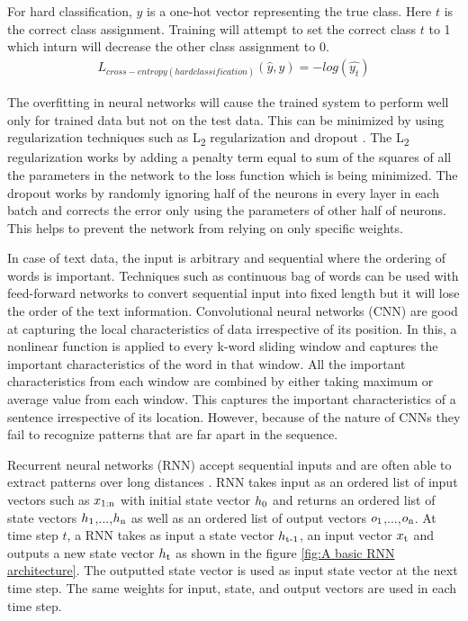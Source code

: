 \documentclass[a4paper, 11pt]{article}
\begin{document}
For hard classification, $y$ is a one-hot vector representing the true class. Here $t$ is the correct class assignment. Training will attempt to set the correct class $t$ to 1 which inturn will decrease the other class assignment to 0.
\begin{align*}
L_{cross-entropy(hard classification)}(\hat{y},y) = -log(\hat{y_t})
\end{align*}

The overfitting in neural networks will cause the trained system to perform well only for trained data but not on the test data. This can be minimized by using regularization techniques such as L\textsubscript{2} regularization and dropout \cite{Hinton2012}. The L\textsubscript{2} regularization works by adding a penalty term equal to sum of the squares of all the parameters in the network to the loss function which is being minimized. The dropout works by randomly ignoring half of the neurons in every layer in each batch and corrects the error only using the parameters of other half of neurons. This helps to prevent the network from relying on only specific weights. 

In case of text data, the input is arbitrary and sequential where the ordering of words is important. Techniques such as continuous bag of words \cite{DBLP:journals/corr/abs-1301-3781} can be used with feed-forward networks to convert sequential input into fixed length but it will lose the order of the text information. Convolutional neural networks (CNN) \cite{Bengio1997} are good at capturing the local characteristics of data irrespective of its position. In this, a nonlinear function is applied to every k-word sliding window and captures the important characteristics of the word in that window. All the important characteristics from each window are combined by either taking maximum or average value from each window. This captures the important characteristics of a sentence irrespective of its location. However, because of the nature of CNNs they fail to recognize patterns that are far apart in the sequence.

Recurrent neural networks (RNN) accept sequential inputs and are often able to extract patterns over long distances \cite{Elman}. RNN takes input as an ordered list of input vectors such as $x\textsubscript{1:n}$ with initial state vector $h\textsubscript{0}$ and returns an ordered list of state vectors $h\textsubscript{1}$,...,$h\textsubscript{n}$ as well as an ordered list of output vectors $o\textsubscript{1}$,...,$o\textsubscript{n}$. At time step $t$, a RNN takes as input a state vector $h\textsubscript{t-1}$, an input vector $x\textsubscript{t}$ and outputs a new state vector $h\textsubscript{t}$ as shown in the figure \ref{fig:A basic RNN architecture}. The outputted state vector is used as input state vector at the next time step. The same weights for input, state, and output vectors are used in each time step.  
\end{document}
